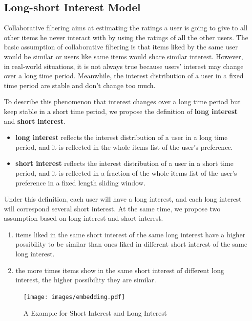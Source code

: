 \documentclass{sig-alternate-05-2015}
\begin{document}
\subsection{Long-short Interest Model}
Collaborative filtering aims at estimating the ratings a user is going to give to
all other items he never interact with by using the ratings of all the other users.
The basic assumption of collaborative filtering is that items liked by the same user
would be similar or users like same items would share similar interest.
However, in real-world situations, it is not always true because users' interest
may change over a long time period.
Meanwhile, the interest distribution of a user in a fixed time period
are stable and don't change too much.

To describe this phenomenon that interest changes over a long time period but
keep stable in a short time period,
we propose the definition of \textbf{long interest} and \textbf{short interest}.

\begin{itemize}
\item \textbf{long interest} reflects the interest distribution of a user
in a long time period, and it is reflected in the whole items list of the user's preference.
\item \textbf{short interest} reflects the interest distribution of a user
in a short time period, and it is reflected in a fraction of the whole items list of
the user's preference in a fixed length sliding window.
\end{itemize}

Under this definition, each user will have a long interest, and each long interest will
correspond several short interest. At the same time,
we propose two assumption based on long interest and short interest.

\begin{enumerate}
\item items liked in the same short interest of the same long interest have a higher
possibility to be similar than ones liked in different short interest of the same long interest.
\item the more times items show in the same short interest of different long interest,
the higher possibility they are similar.
\end{enumerate}

\begin{figure}[htbp]
	\centering
	\texttt{[image: images/embedding.pdf]}
	\caption{A Example for Short Interest and Long Interest}
	\label{fig:embedding}
\end{figure}
\end{document}
